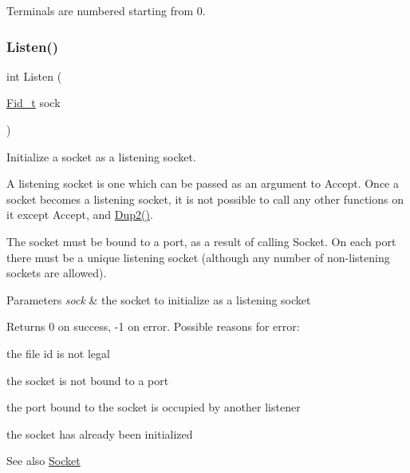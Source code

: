 Terminals are numbered starting from 0. \mbox{\label{group__syscalls_ga9ff5bae3e7b9e5bbf5a788a5ff739bf7}} 
\subsubsection{\texorpdfstring{Listen()}{Listen()}}
{\footnotesize\ttfamily int Listen (\begin{DoxyParamCaption}\item[{\hyperlink{group__syscalls_ga5097222c5f0da97d92d4712359abc38f}{Fid\+\_\+t}}]{sock }\end{DoxyParamCaption})}



Initialize a socket as a listening socket. 

A listening socket is one which can be passed as an argument to {\ttfamily Accept}. Once a socket becomes a listening socket, it is not possible to call any other functions on it except {\ttfamily Accept},  and {\ttfamily \hyperlink{group__syscalls_gacc048c60209e2dfb4b5cfc1c3f21aa88}{Dup2()}}.

The socket must be bound to a port, as a result of calling {\ttfamily Socket}. On each port there must be a unique listening socket (although any number of non-\/listening sockets are allowed).


\begin{DoxyParams}{Parameters}
{\em sock} & the socket to initialize as a listening socket \\
\hline
\end{DoxyParams}
\begin{DoxyReturn}{Returns}
0 on success, -\/1 on error. Possible reasons for error\+:
\begin{DoxyItemize}
\item the file id is not legal
\item the socket is not bound to a port
\item the port bound to the socket is occupied by another listener
\item the socket has already been initialized 
\end{DoxyItemize}
\end{DoxyReturn}
\begin{DoxySeeAlso}{See also}
\hyperlink{group__syscalls_gadf167321edde68e905173d8056d3eb2f}{Socket} 
\end{DoxySeeAlso}
\mbox{\label{group__syscalls_ga1140be44df71d39edaf6a7262fb763ca}} 
